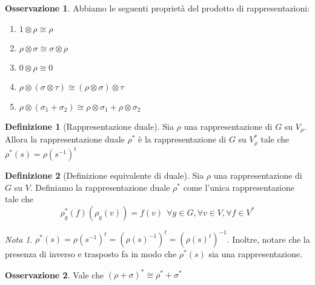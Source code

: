 \documentclass[11pt]{article}
\theoremstyle{plain}
\theoremstyle{definition}
\newtheorem{defn}{Definizione}[section]
\newtheorem*{rem}{Osservazione}
\theoremstyle{remark}
\newtheorem*{note}{Nota}
\begin{document}
\begin{rem}
Abbiamo le seguenti proprietà del prodotto di rappresentazioni:
\begin{enumerate}
\item $1\otimes \rho \cong \rho$
\item $\rho \otimes \sigma \cong \sigma \otimes \rho$
\item $0 \otimes \rho \cong 0$
\item $\rho \otimes (\sigma \otimes \tau) \cong (\rho \otimes \sigma)\otimes \tau$
\item $\rho \otimes (\sigma_1 + \sigma_2) \cong \rho \otimes \sigma_1 + \rho \otimes \sigma_2$
\end{enumerate}
\end{rem}




\begin{defn}[Rappresentazione duale]
Sia $\rho$ una rappresentazione di $G$ su $V_\rho$. Allora la rappresentazione duale $\rho^*$ è la rappresentazione di $G$ su $V_\rho ^*$ tale che $\rho^*(s)=\rho(s^{-1})^t$
\label{defn:rappresentazione duale}
\end{defn}

\begin{defn}[Definizione equivalente di duale]
Sia $\rho$ una rappresentazione di $G$ su $V$. Definiamo la rappresentazione duale $\rho^*$ come l'unica rappresentazione tale che
\[\rho_g^*(f)(\rho_g(v))=f(v)\ \ \forall g\in G,\forall v\in V,\forall f\in V^*\]
\end{defn}

\begin{note}
$\rho^*(s)=\rho(s^{-1})^t=\left(\rho(s)^{-1}\right)^t=\left(\rho(s)^t\right)^{-1}$. Inoltre, notare che la presenza di inverso e trasposto fa in modo che $\rho^*(s)$ sia una rappresentazione.
\end{note}


\begin{rem}
	Vale che $(\rho + \sigma)^* \cong \rho^* + \sigma^*$
\end{rem}
\end{document}
